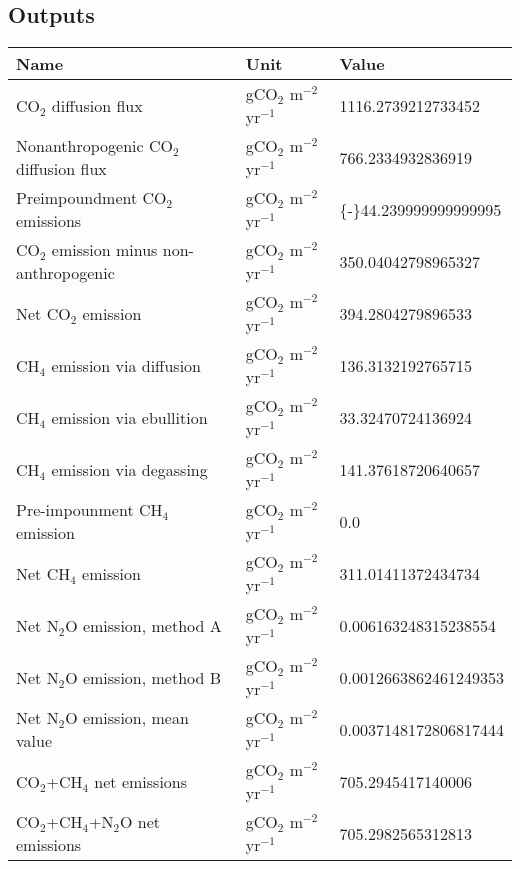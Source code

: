\documentclass{article}%
\begin{document}
%
\subsection{Outputs}%
\label{subsec:Outputs}%
\begin{center}%
\renewcommand{\arraystretch}{1.0}%
\begin{tabu}{@{}p{10cm} X[c] X[l]@{}}%
\toprule%
\textbf{Name}&\textbf{Unit}&\textbf{Value}\\%
\midrule%
CO$_2$ diffusion flux&gCO$_2$ m$^{-2}$ yr$^{-1}$&\num[round-precision=4,round-mode=figures]{1116.2739212733452}\\%
Nonanthropogenic CO$_2$ diffusion flux&gCO$_2$ m$^{-2}$ yr$^{-1}$&\num[round-precision=4,round-mode=figures]{766.2334932836919}\\%
Preimpoundment CO$_2$ emissions&gCO$_2$ m$^{-2}$ yr$^{-1}$&\num[round-precision=4,round-mode=figures]{{-}44.239999999999995}\\%
CO$_2$ emission minus non-anthropogenic&gCO$_2$ m$^{-2}$ yr$^{-1}$&\num[round-precision=4,round-mode=figures]{350.04042798965327}\\%
Net CO$_2$ emission&gCO$_2$ m$^{-2}$ yr$^{-1}$&\num[round-precision=4,round-mode=figures]{394.2804279896533}\\%
CH$_4$ emission via diffusion&gCO$_2$ m$^{-2}$ yr$^{-1}$&\num[round-precision=4,round-mode=figures]{136.3132192765715}\\%
CH$_4$ emission via ebullition&gCO$_2$ m$^{-2}$ yr$^{-1}$&\num[round-precision=4,round-mode=figures]{33.32470724136924}\\%
CH$_4$ emission via degassing&gCO$_2$ m$^{-2}$ yr$^{-1}$&\num[round-precision=4,round-mode=figures]{141.37618720640657}\\%
Pre-impounment CH$_4$ emission&gCO$_2$ m$^{-2}$ yr$^{-1}$&\num[round-precision=4,round-mode=figures]{0.0}\\%
Net CH$_4$ emission&gCO$_2$ m$^{-2}$ yr$^{-1}$&\num[round-precision=4,round-mode=figures]{311.01411372434734}\\%
Net N$_2$O emission, method A&gCO$_2$ m$^{-2}$ yr$^{-1}$&\num[round-precision=4,round-mode=figures]{0.006163248315238554}\\%
Net N$_2$O emission, method B&gCO$_2$ m$^{-2}$ yr$^{-1}$&\num[round-precision=4,round-mode=figures]{0.0012663862461249353}\\%
Net N$_2$O emission, mean value&gCO$_2$ m$^{-2}$ yr$^{-1}$&\num[round-precision=4,round-mode=figures]{0.0037148172806817444}\\%
\midrule%
CO$_2$+CH$_4$ net emissions&gCO$_2$ m$^{-2}$ yr$^{-1}$&\num[round-precision=4,round-mode=figures]{705.2945417140006}\\%
\midrule%
CO$_2$+CH$_4$+N$_2$O net emissions&gCO$_2$ m$^{-2}$ yr$^{-1}$&\num[round-precision=4,round-mode=figures]{705.2982565312813}\\\bottomrule%
%
\end{tabu}%
\end{center}%
\end{document}
